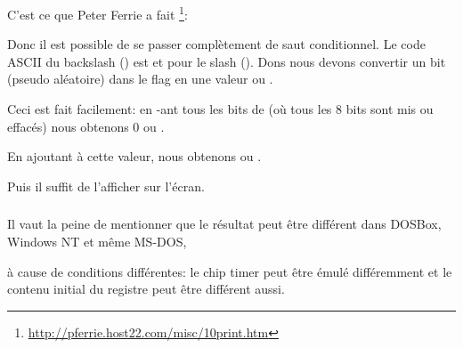 C'est ce que Peter Ferrie a fait
\footnote{\url{http://pferrie.host22.com/misc/10print.htm}}:



Donc il est possible de se passer complètement de saut conditionnel.
Le code \ac{ASCII} du backslash (\q{\textbackslash{}}) est  et 
pour le slash (\q{/}).
Dons nous devons convertir un bit (pseudo aléatoire) dans le flag  en une
valeur  ou .

Ceci est fait facilement: en -ant tous les bits de  (où tous les 8
bits sont mis ou effacés) nous obtenons 0 ou .

En ajoutant  à cette valeur, nous obtenons  ou .

Puis il suffit de l'afficher sur l'écran.

\subsubsection{\Conclusion{}}

Il vaut la peine de mentionner que le résultat peut être différent dans DOSBox, \gls{Windows NT}
et même MS-DOS,

à cause de conditions différentes: le chip timer peut être émulé différemment et le
contenu initial du registre peut être différent aussi.
